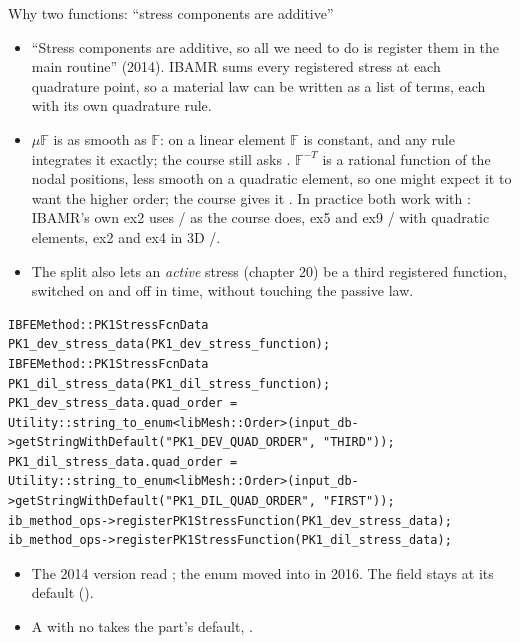 \documentclass[aspectratio=169,11pt]{beamer}
\begin{document}
\begin{frame}[fragile]{Why two functions: ``stress components are additive''}
\label{fr:split}
\scriptsize
\begin{itemize}
  \item ``Stress components are additive, so all we need to do is register them in the main routine'' (2014). IBAMR sums every registered stress at each quadrature point, so a material law can be written as a list of terms, each with its own quadrature rule.
  \item $\mu\mathbb{F}$ is as smooth as $\mathbb{F}$: on a linear element $\mathbb{F}$ is constant, and any rule integrates it exactly; the course still asks . $\mathbb{F}^{-T}$ is a rational function of the nodal positions, less smooth on a quadratic element, so one might expect it to want the higher order; the course gives it . In practice both work with : IBAMR's own ex2 uses / as the course does, ex5 and ex9 / with quadratic elements, ex2 and ex4 in 3D /.
  \item The split also lets an \emph{active} stress (chapter 20) be a third registered function, switched on and off in time, without touching the passive law.
\end{itemize}
\begin{lstlisting}[style=cpptiny]
IBFEMethod::PK1StressFcnData PK1_dev_stress_data(PK1_dev_stress_function);
IBFEMethod::PK1StressFcnData PK1_dil_stress_data(PK1_dil_stress_function);
PK1_dev_stress_data.quad_order = Utility::string_to_enum<libMesh::Order>(input_db->getStringWithDefault("PK1_DEV_QUAD_ORDER", "THIRD"));
PK1_dil_stress_data.quad_order = Utility::string_to_enum<libMesh::Order>(input_db->getStringWithDefault("PK1_DIL_QUAD_ORDER", "FIRST"));
ib_method_ops->registerPK1StressFunction(PK1_dev_stress_data);
ib_method_ops->registerPK1StressFunction(PK1_dil_stress_data);
\end{lstlisting}
\begin{itemize}
  \item The 2014 version read ; the enum moved into  in 2016. The  field stays at its default ().
  \item A  with no  takes the part's default, .
\end{itemize}
\end{frame}
\end{document}
